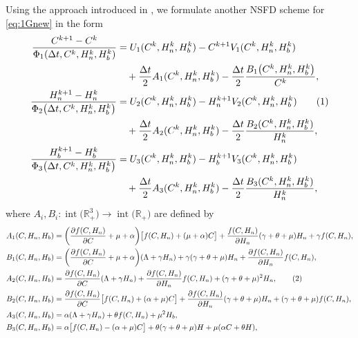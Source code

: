 \documentclass[11pt]{article}
\theoremstyle{definition}
\theoremstyle{remark}
\numberwithin{equation}{section}
\DeclareMathOperator{\interior}{int}
\begin{document}
Using the approach introduced in \cite{HoangMatthias2026}, we formulate another NSFD scheme for \eqref{eq:1Gnew} in the form
\begin{align*}
\dfrac{C^{k + 1} - C^k}{\Phi_1(\Delta t, C^k, H_n^k, H_b^k)} 
&= U_1(C^k, H_n^k, H_b^k) - C^{k+1}V_1(C^k, H_n^k, H_b^k)\\
&\quad+ \dfrac{\Delta t}{2} A_1(C^k, H_n^k, H_b^k) - \dfrac{\Delta t}{2} \dfrac{B_1\big(C^k, H_n^k, H_b^k\big)}{C^k},\\
\dfrac{H_n^{k + 1} - H_n^k}{\Phi_2\big(\Delta t, C^k, H_n^k, H_b^k\big)} 
&= U_2(C^k, H_n^k, H_b^k) - H_n^{k+1}V_2(C^k, H_n^k, H_b^k)
\stepcounter{equation}\tag{\theequation}\label{eq:NSFD2}\\
&\quad+ \dfrac{\Delta t}{2} A_2(C^k, H_n^k, H_b^k) - \dfrac{\Delta t}{2} \dfrac{B_2(C^k, H_n^k, H_b^k)}{H_n^k},\\
\dfrac{H_b^{k + 1} - H_b^k}{\Phi_3\big(\Delta t, C^k, H_n^k, H_b^k\big)} 
&= U_3(C^k, H_n^k, H_b^k) - H_b^{k+1}V_3(C^k, H_n^k, H_b^k)\\
&\quad+ \dfrac{\Delta t}{2} A_3(C^k, H_n^k, H_b^k) - \dfrac{\Delta t}{2} \dfrac{B_3(C^k, H_n^k, H_b^k)}{H_n^k},
\end{align*}
where $A_i, B_i\colon \interior\big(\mathbb{R}_+^3\big) \to\interior\big(\mathbb{R}_+\big)$ are defined by
\begin{align*}
A_1(C, H_n, H_b) &= \bigg(\dfrac{\partial f(C, H_n)}{\partial C} + \mu + \alpha\bigg)\big[f(C, H_n) + (\mu + \alpha)C\big] + \dfrac{f(C, H_n)}{\partial H_n}(\gamma + \theta + \mu)H_n + \gamma f(C, H_n),\\
B_1(C, H_n, H_b) &= \bigg(\dfrac{\partial f(C, H_n)}{\partial C} + \mu + \alpha\bigg)(\Lambda + \gamma H_n) + \gamma(\gamma + \theta + \mu)H_n + \dfrac{\partial f(C, H_n)}{\partial H_n}f(C, H_n),\\
A_2(C, H_n, H_b) &= \dfrac{\partial f(C, H_n)}{\partial C}(\Lambda + \gamma H_n) + \dfrac{\partial f(C, H_n)}{\partial H_n}f(C, H_n) + (\gamma + \theta  + \mu)^2 H_n,
\stepcounter{equation}\tag{\theequation}\label{eq:NSFD3}\\
B_2(C, H_n, H_b) &= \dfrac{\partial f(C, H_n)}{\partial C}\big[f(C, H_n) + (\alpha + \mu)C\big] +  \dfrac{\partial f(C, H_n)}{\partial H_n}(\gamma + \theta + \mu)H_n + (\gamma + \theta + \mu)f(C, H_n),\\
A_3(C, H_n, H_b) &= \alpha(\Lambda + \gamma H_n) + \theta f(C, H_n) + \mu^2H_b,\\
B_3(C, H_n, H_b) &= \alpha\big[f(C, H_n) - (\alpha + \mu)C\big] + \theta(\gamma + \theta + \mu)H + \mu(\alpha C + \theta H),
\end{align*}
\end{document}
